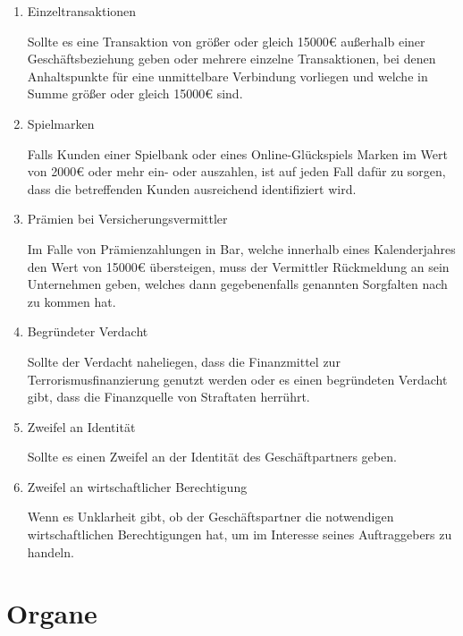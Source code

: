 \documentclass{article}
\begin{document}
        \begin{enumerate}

            \item Einzeltransaktionen

                Sollte es eine Transaktion von größer oder gleich 15000€ außerhalb einer Geschäftsbeziehung geben oder mehrere einzelne Transaktionen, bei denen Anhaltspunkte für eine unmittelbare Verbindung vorliegen und welche in Summe größer oder gleich 15000€ sind.

            \item Spielmarken

                Falls Kunden einer Spielbank oder eines Online-Glückspiels Marken im Wert von 2000€ oder mehr ein- oder auszahlen, ist auf jeden Fall dafür zu sorgen, dass die betreffenden Kunden ausreichend identifiziert wird.

            \item Prämien bei Versicherungsvermittler

                Im Falle von Prämienzahlungen in Bar, welche innerhalb eines Kalenderjahres den Wert von 15000€ übersteigen, muss der Vermittler Rückmeldung an sein Unternehmen geben, welches dann gegebenenfalls genannten Sorgfalten nach zu kommen hat.

\newpage

            \item Begründeter Verdacht 

                Sollte der Verdacht naheliegen, dass die Finanzmittel zur Terrorismusfinanzierung genutzt werden oder es einen begründeten Verdacht gibt, dass die Finanzquelle von Straftaten herrührt.

            \item Zweifel an Identität

                Sollte es einen Zweifel an der Identität des Geschäftpartners geben.

            \item Zweifel an wirtschaftlicher Berechtigung

                Wenn es Unklarheit gibt, ob der Geschäftspartner die notwendigen wirtschaftlichen Berechtigungen hat, um im Interesse seines Auftraggebers zu handeln.

        \end{enumerate}    
    

    \section[Organe]{Organe}
\end{document}
